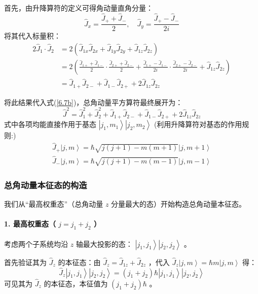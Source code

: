 首先，由升降算符的定义可得角动量直角分量：
\begin{equation}
	\hat{J}_x = \frac{\hat{J}_+ + \hat{J}_-}{2}, \quad \hat{J}_y = \frac{\hat{J}_+ - \hat{J}_-}{2i}
\end{equation}
将其代入标量积：
\begin{align}
	2\hat{J}_1 \cdot \hat{J}_2 &= 2\left( \hat{J}_{1x}\hat{J}_{2x} + \hat{J}_{1y}\hat{J}_{2y} + \hat{J}_{1z}\hat{J}_{2z} \right) \\
	&= 2\left( \frac{\hat{J}_{1+}+\hat{J}_{1-}}{2} \cdot \frac{\hat{J}_{2+}+\hat{J}_{2-}}{2} + \frac{\hat{J}_{1+}-\hat{J}_{1-}}{2i} \cdot \frac{\hat{J}_{2+}-\hat{J}_{2-}}{2i} + \hat{J}_{1z}\hat{J}_{2z} \right) \\
	&= \hat{J}_{1+}\hat{J}_{2-} + \hat{J}_{1-}\hat{J}_{2+} + 2\hat{J}_{1z}\hat{J}_{2z}
\end{align}

将此结果代入式(\ref{6.7b})，总角动量平方算符最终展开为：
\begin{equation}
	\boxed{\hat{J}^2 = \hat{J}_1^2 + \hat{J}_2^2 + \hat{J}_{1+}\hat{J}_{2-} + \hat{J}_{1-}\hat{J}_{2+} + 2\hat{J}_{1z}\hat{J}_{2z}}
	\label{6.9}
\end{equation}
式中各项均能直接作用于基态 \(\left| j_1, m_1 \right>\left| j_2, m_2 \right>\) (利用升降算符对基态的作用规则:)
\begin{align}
	\hat{J}_+ \left| j, m \right> = \hbar\sqrt{j(j+1)-m(m+1)} \left| j, m+1 \right>\\
	\hat{J}_- \left| j, m \right> = \hbar\sqrt{j(j+1)-m(m-1)} \left| j, m-1 \right>
\end{align}


\subsubsection{总角动量本征态的构造}
我们从“最高权重态”（总角动量  \(z\)  分量最大的态）开始构造总角动量本征态。

\paragraph{1. 最高权重态（ \(j = j_1 + j_2\) ）}

考虑两个子系统均沿 \(z\) 轴最大投影的态： \(\left| j_1, j_1 \right>\left| j_2, j_2 \right>\) 。

首先验证其为 \(\hat{J}_z\) 的本征态：由 \(\hat{J}_z = \hat{J}_{1z} + \hat{J}_{2z}\) ，代入 \(\hat{J}_{z} \left| j, m \right> = \hbar m \left| j, m \right>\) 得：
\begin{equation}
	\hat{J}_z \left| j_1, j_1 \right>\left| j_2, j_2 \right> = (j_1 + j_2)\hbar \left| j_1, j_1 \right>\left| j_2, j_2 \right> \tag{6.10}
\end{equation}
可见其为 \(\hat{J}_z\) 的本征态，本征值为 \((j_1+j_2)\hbar\) 。

